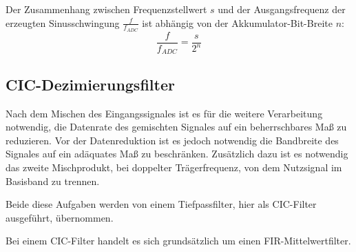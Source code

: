 Der Zusammenhang zwischen Frequenzstellwert $s$ und der Ausgangsfrequenz der erzeugten Sinusschwingung $\frac{f}{f_{ADC}}$ ist abhängig von der Akkumulator-Bit-Breite $n$:
\begin{equation}
	\frac{f}{f_{ADC}} = \frac{s}{2^n}
\end{equation}

\subsection{\acs{CIC}-Dezimierungsfilter} \label{Sec:CIC}
Nach dem Mischen des Eingangssignales ist es für die weitere Verarbeitung notwendig, die Datenrate des gemischten Signales auf ein beherrschbares Maß zu reduzieren.
Vor der Datenreduktion ist es jedoch notwendig die Bandbreite des Signales auf ein adäquates Maß zu beschränken.
Zusätzlich dazu ist es notwendig das zweite Mischprodukt, bei doppelter Trägerfrequenz, von dem Nutzsignal im Basisband zu trennen.

Beide diese Aufgaben werden von einem Tiefpassfilter, hier als \acs{CIC}-Filter ausgeführt, übernommen.

Bei einem \acl{CIC}-Filter handelt es sich grundsätzlich um einen \acs{FIR}-Mittelwertfilter.

